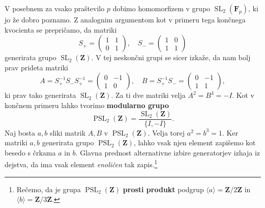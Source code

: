 \documentclass[11pt]{book}
\def\ZZ{\mathbf{Z}}
\def\FF{\mathbf{F}}
\DeclareMathOperator\SL{SL}
\DeclareMathOperator\PSL{PSL}
\def\definicija{\color{rdeca}\bf}
\theoremstyle{definition}
\theoremstyle{zgled}
\theoremstyle{zgledbrezstevilke}
\theoremstyle{odprtproblem}
\theoremstyle{domacanaloga}
\theoremstyle{izrek}
\begin{document}
V posebnem za vsako praštevilo $p$ dobimo homomorfizem v grupo $\SL_2(\FF_p)$, ki jo že dobro poznamo. Z analognim argumentom kot v primeru tega končnega kvocienta se prepričamo, da matriki
\[
    S_+ = \begin{pmatrix}
        1 & 1 \\ 0 & 1
    \end{pmatrix},
    \quad
    S_- = \begin{pmatrix}
        1 & 0 \\ 1 & 1
    \end{pmatrix}
\]
generirata grupo $\SL_2(\ZZ)$. V tej neskončni grupi se sicer izkaže, da nam bolj prav prideta matriki
\[
    A = S_+^{-1} S_- S_+^{-1} = \begin{pmatrix}
        0 & -1 \\ 1 & 0
    \end{pmatrix},
    \quad
    B = S_+^{-1} S_- = \begin{pmatrix}
        0 & -1 \\
        1 & 1
    \end{pmatrix},
\]
ki prav tako generirata $\SL_2(\ZZ)$. Za ti dve matriki velja $A^2 = B^3 = -I$. Kot v končnem primeru lahko tvorimo {\definicija modularno grupo}
\[
    {\textstyle \PSL_2(\ZZ)} = \frac{\SL_2(\ZZ)}{\{ I, -I \}}.
\]
Naj bosta $a,b$ sliki matrik $A,B$ v $\PSL_2(\ZZ)$. Velja torej $a^2 = b^3 = 1$. Ker matriki $a,b$ generirata grupo $\PSL_2(\ZZ)$, lahko vsak njen element zapišemo kot besedo s črkama $a$ in $b$. Glavna prednost alternativne izbire generatorjev izhaja iz dejstva, da ima vsak element \emph{enoličen} tak zapis.\footnote{Rečemo, da je grupa $\PSL_2(\ZZ)$ {\definicija prosti produkt} podgrup $\langle a \rangle = \ZZ/2\ZZ$ in $\langle b \rangle = \ZZ/3\ZZ$.}
\end{document}
